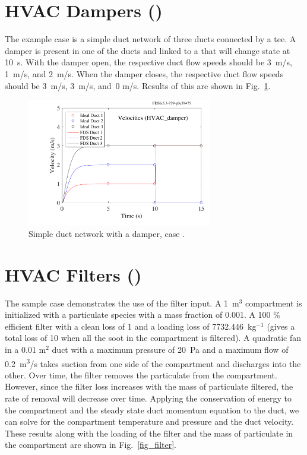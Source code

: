 \documentclass[11pt]{book}
\begin{document}
\section{HVAC Dampers (\texorpdfstring{}{HVAC\_damper})}
\label{HVAC_damper}

The  example case is a simple duct network of three ducts connected by a tee.  A damper is present in one of the ducts and linked to a  that will change state at 10~s.  With the damper open, the respective duct flow speeds should be 3~m/s, 1~m/s, and 2~m/s.  When the damper closes, the respective duct flow speeds should be 3~m/s, 3~m/s, and~0 m/s.  Results of this are shown in Fig.~\ref{fig:HVAC_damper}.

\begin{figure}[h!]
\centering
\includegraphics[height=2.2in]{SCRIPT_FIGURES/HVAC_damper}
\caption[Example case ]{Simple duct network with a damper, case .}
\label{fig:HVAC_damper}
\end{figure}



\section{HVAC Filters (\texorpdfstring{}{HVAC\_filter})}
\label{HVAC_filter}

The sample case  demonstrates the use of the filter input.  A 1~m$^3$ compartment is initialized with a particulate species with a mass fraction of 0.001.  A 100 \% efficient filter with a clean loss of 1 and a loading loss of 7732.446~kg$^{-1}$ (gives a total loss of 10 when all the soot in the compartment is filtered).  A quadratic fan in a 0.01 m$^2$ duct with a maximum pressure of 20~Pa and a maximum flow of 0.2~\si{m^3/s} takes suction from one side of the compartment and discharges into the other.  Over time, the filter removes the particulate from the compartment.  However, since the filter loss increases with the mass of particulate filtered, the rate of removal will decrease over time.  Applying the conservation of energy to the compartment and the steady state duct momentum equation to the duct, we can solve for the compartment temperature and pressure and the duct velocity.  These results along with the loading of the filter and the mass of particulate in the compartment are shown in Fig.~\ref{fig_filter}.
\end{document}
